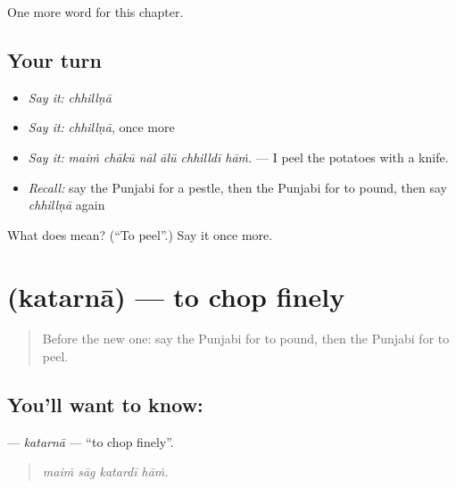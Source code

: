 \begin{grammarlens}[title={What you've built}]
One more word for this chapter.
\end{grammarlens}

\subsection*{Your turn}
\begin{itemize}
\raggedright
  \item \emph{Say it:} \emph{chhillṇā}
  \item \emph{Say it:} \emph{chhillṇā}, once more
  \item \emph{Say it:} \emph{maiṁ chākū nāl ālū chhilldī hāṁ.} — I peel the potatoes with a knife.
  \item \emph{Recall:} say the Punjabi for a pestle, then the Punjabi for to pound, then say \emph{chhillṇā} again
\end{itemize}

\begin{tcolorbox}[breakable,colback=teal!4,colframe=teal!35!black,title={Before you move on}]
What does  mean? (\textquotedblleft{}To peel\textquotedblright{}.) Say it once more.
\end{tcolorbox}
\section[\texorpdfstring{\pa{ਕਤਰਨਾ} (katarnā)}{ਕਤਰਨਾ (katarnā)}]{ (katarnā) — to chop finely}

\label{lesson:PA-C241-katarna}



\begin{quote}
Before the new one: say the Punjabi for to pound, then the Punjabi for to peel.
\end{quote}

\subsection*{You'll want to know: }
\textbf{} — \emph{katarnā} — \textquotedblleft{}to chop finely\textquotedblright{}.

\begin{quote}
   
\end{quote}

\begin{quote}
\emph{maiṁ sāg katardī hāṁ.}
\end{quote}

